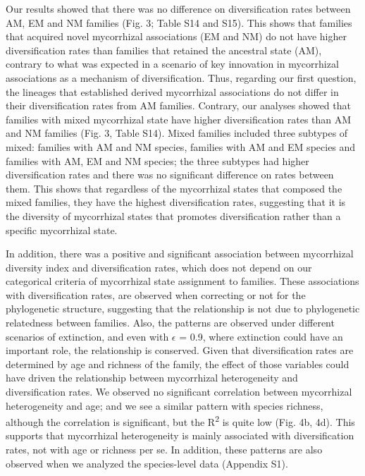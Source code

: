 \documentclass[
  12pt,
]{article}
\begin{document}
Our results showed that there was no difference on diversification rates
between AM, EM and NM families (Fig. 3; Table S14 and S15). This shows
that families that acquired novel mycorrhizal associations (EM and NM)
do not have higher diversification rates than families that retained the
ancestral state (AM), contrary to what was expected in a scenario of key
innovation in mycorrhizal associations as a mechanism of
diversification. Thus, regarding our first question, the lineages that
established derived mycorrhizal associations do not differ in their
diversification rates from AM families. Contrary, our analyses showed
that families with mixed mycorrhizal state have higher diversification
rates than AM and NM families (Fig. 3, Table S14). Mixed families
included three subtypes of mixed: families with AM and NM species,
families with AM and EM species and families with AM, EM and NM species;
the three subtypes had higher diversification rates and there was no
significant difference on rates between them. This shows that regardless
of the mycorrhizal states that composed the mixed families, they have
the highest diversification rates, suggesting that it is the diversity
of mycorrhizal states that promotes diversification rather than a
specific mycorrhizal state.

In addition, there was a positive and significant association between
mycorrhizal diversity index and diversification rates, which does not
depend on our categorical criteria of mycorrhizal state assignment to
families. These associations with diversification rates, are observed
when correcting or not for the phylogenetic structure, suggesting that
the relationship is not due to phylogenetic relatedness between
families. Also, the patterns are observed under different scenarios of
extinction, and even with \(\epsilon\) = 0.9, where extinction could
have an important role, the relationship is conserved. Given that
diversification rates are determined by age and richness of the family,
the effect of those variables could have driven the relationship between
mycorrhizal heterogeneity and diversification rates. We observed no
significant correlation between mycorrhizal heterogeneity and age; and
we see a similar pattern with species richness, although the correlation
is significant, but the R\textsuperscript{2} is quite low (Fig. 4b, 4d).
This supports that mycorrhizal heterogeneity is mainly associated with
diversification rates, not with age or richness per se. In addition,
these patterns are also observed when we analyzed the species-level data
(Appendix S1).
\end{document}
